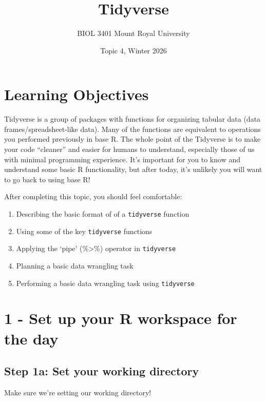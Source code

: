 \documentclass[
]{article}
\title{Tidyverse}
\author{BIOL 3401 Mount Royal University}
\date{Topic 4, Winter 2026}
\providecommand{\tightlist}{%
  \setlength{\itemsep}{0pt}\setlength{\parskip}{0pt}}
\begin{document}
\maketitle

{
\setcounter{tocdepth}{2}
\tableofcontents
}
\section{\texorpdfstring{\textbf{Learning
Objectives}}{Learning Objectives}}\label{learning-objectives}

Tidyverse is a group of packages with functions for organizing tabular
data (data frames/spreadsheet-like data). Many of the functions are
equivalent to operations you performed previously in base R. The whole
point of the Tidyverse is to make your code ``cleaner'' and easier for
humans to understand, especially those of us with minimal programming
experience. It's important for you to know and understand some basic R
functionality, but after today, it's unlikely you will want to go back
to using base R!

After completing this topic, you should feel comfortable:

\begin{enumerate}
\def\labelenumi{\arabic{enumi}.}
\tightlist
\item
  Describing the basic format of of a \texttt{tidyverse} function
\item
  Using some of the key \texttt{tidyverse} functions
\item
  Applying the `pipe' (\%\textgreater\%) operator in \texttt{tidyverse}
\item
  Planning a basic data wrangling task
\item
  Performing a basic data wrangling task using \texttt{tidyverse}
\end{enumerate}

\section{1 - Set up your R workspace for the
day}\label{set-up-your-r-workspace-for-the-day}

\subsection{Step 1a: Set your working
directory}\label{step-1a-set-your-working-directory}

Make sure we're setting our working directory!
\end{document}
